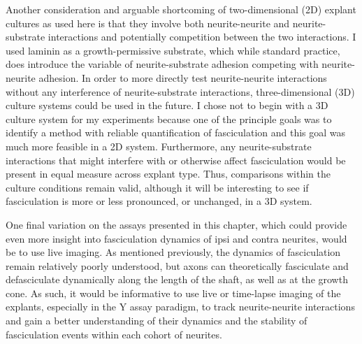 Another consideration and arguable shortcoming of two-dimensional (2D) explant cultures as used here is that they involve both neurite-neurite and neurite-substrate interactions and potentially competition between the two interactions.
I used laminin as a growth-permissive substrate, which while standard practice, does introduce the variable of neurite-substrate adhesion competing with neurite-neurite adhesion.
In order to more directly test neurite-neurite interactions without any interference of neurite-substrate interactions, three-dimensional (3D) culture systems could be used in the future.
I chose not to begin with a 3D culture system for my experiments because one of the principle goals was to identify a method with reliable quantification of fasciculation and this goal was much more feasible in a 2D system.
Furthermore, any neurite-substrate interactions that might interfere with or otherwise affect fasciculation would be present in equal measure across explant type.
Thus, comparisons within the culture conditions remain valid, although it will be interesting to see if fasciculation is more or less pronounced, or unchanged, in a 3D system.

One final variation on the assays presented in this chapter, which could provide even more insight into fasciculation dynamics of ipsi and contra neurites, would be to use live imaging. 
As mentioned previously, the dynamics of fasciculation remain relatively poorly understood, but axons can theoretically fasciculate and defasciculate dynamically along the length of the shaft, as well as at the growth cone.
As such, it would be informative to use live or time-lapse imaging of the explants, especially in the Y assay paradigm, to track neurite-neurite interactions and gain a better understanding of their dynamics and the stability of fasciculation events within each cohort of neurites.